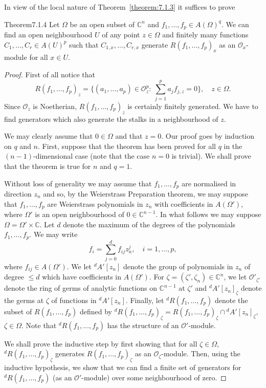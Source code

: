 In view of the local nature of Theorem~\ref{theorem:7.1.3} it suffices to prove
\begin{originaltheorem}{Theorem}{7.1.4}
Let $\Omega$ be an open subset of $\mathbb{C}^n$ and $f_1,\ldots,f_p\in A(\Omega)^q$. We can find an open neighbourhood $U$ of any point $z\in\Omega$ and finitely many functions $C_1,\ldots,C_r\in A(U)^p$ such that $C_{1,x},\ldots,C_{r,x}$ generate $R(f_1,\ldots,f_p)_x$ as an $\mathcal{O}_x$-module for all $x\in U$.
\end{originaltheorem}
\begin{proof}
First of all notice that
\[
R(f_1,\ldots,f_p)_z=\{(a_1,\ldots,a_p)\in\mathcal{O}_z^p:\ \sum_{j=1}^p a_jf_{j,z}=0\},\quad z\in\Omega.
\]
Since $\mathcal{O}_z$ is Noetherian, $R(f_1,\ldots,f_p)_z$ is certainly finitely generated. We have to find generators which also generate the stalks in a neighbourhood of $z$.

We may clearly assume that $0\in\Omega$ and that $z=0$. Our proof goes by induction on $q$ and $n$. First, suppose that the theorem has been proved for all $q$ in the $(n-1)$-dimensional case (note that the case $n=0$ is trivial). We shall prove that the theorem is true for $n$ and $q=1$.

Without loss of generality we may assume that $f_1,\ldots,f_p$ are normalised in direction $z_n$ and so, by the Weierstrass Preparation theorem, we may suppose that $f_1,\ldots,f_p$ are Weierstrass polynomials in
$z_n$ with coefficients in $A(\Omega')$, where $\Omega'$ is an open neighbourhood of $0\in\mathbb{C}^{n-1}$. In what follows we may suppose $\Omega=\Omega'\times\mathbb{C}$. Let $d$ denote the maximum of the degrees of the polynomials $f_1,\ldots,f_p$. We may write
\[
f_i=\sum_{j=0}^d f_{ij}z_n^j,\quad i=1,\ldots,p,
\]
where $f_{ij}\in A(\Omega')$. We let ${}^d A'[z_n]$ denote the group of polynomials in $z_n$ of degree $\leq d$ which have coefficients in $A(\Omega')$. For $\zeta=(\zeta',\zeta_n)\in\mathbb{C}^n$, we let $\mathcal{O}'_{\zeta'}$ denote the ring of germs of analytic functions on $\mathbb{C}^{n-1}$ at $\zeta'$ and ${}^d A'[z_n]_\zeta$ denote the germs at $\zeta$ of functions in ${}^d A'[z_n]$. Finally, let ${}^d R(f_1,\ldots,f_p)$ denote the subset of $R(f_1,\ldots,f_p)$ defined by ${}^d R(f_1,\ldots,f_p)_\zeta=R(f_1,\ldots,f_p)_\zeta\cap{}^d A'[z_n]_\zeta$, $\zeta\in\Omega$. Note that ${}^d R(f_1,\ldots,f_p)$ has the structure of an $\mathcal{O}'$-module.

We shall prove the inductive step by first showing that for all $\zeta\in\Omega$, ${}^d R(f_1,\ldots,f_p)_\zeta$ generates $R(f_1,\ldots,f_p)_\zeta$ as an $\mathcal{O}_\zeta$-module. Then, using the inductive hypothesis, we show that we can find a finite set of generators for ${}^d R(f_1,\ldots,f_p)$ (as an $\mathcal{O}'$-module) over some neighbourhood of zero.


\end{proof}
